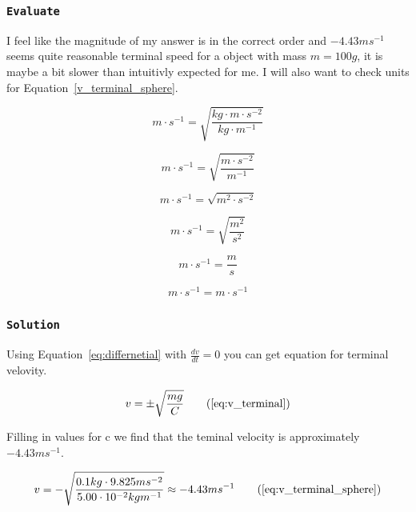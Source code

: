 \documentclass{article}
\let\oldsubsubsection\subsubsection
\renewcommand{\subsubsection}[1]{%
  \oldsubsubsection{\texttt{#1}}%
}
\begin{document}
\clearpage
\subsubsection{Evaluate}
I feel like the magnitude of my answer is in the correct order and \(-4.43ms^{-1}\) seems quite reasonable terminal speed for a object with mass \(m = 100g\), it is maybe a bit slower than intuitivly expected for me. I will also want to check units for Equation~\ref{v_terminal_sphere}.

\begin{equation*}
    m \cdot s^{-1} = \sqrt{\frac{kg \cdot m \cdot s^{-2}}{kg \cdot m^{-1}}}
\end{equation*}

\begin{equation*}
    m \cdot s^{-1} = \sqrt{\frac{m \cdot s^{-2}}{m^{-1}}}
\end{equation*}

\begin{equation*}
    m \cdot s^{-1} = \sqrt{m^2 \cdot s^{-2}}
\end{equation*}

\begin{equation*}
    m \cdot s^{-1} = \sqrt{\frac{m^2}{s^2}}
\end{equation*}

\begin{equation*}
    m \cdot s^{-1} = \frac{m}{s}
\end{equation*}

\begin{equation*}
    m \cdot s^{-1} = m \cdot s^{-1}
\end{equation*}

\subsubsection{Solution}
Using Equation~\ref{eq:differnetial} with \(\frac{dv}{dt}=0\) you can get equation for terminal velovity.

\begin{equation*}
    v = \pm\sqrt{\frac{mg}{C}}
    \tag{\ref{eq:v_terminal}}
\end{equation*}

Filling in values for c we find that the teminal velocity is approximately \(-4.43ms^{-1}\).

\begin{equation*}
    v = -\sqrt{\frac{0.1kg \cdot 9.825 ms^{-2}}{5.00 \cdot10^{-2}kgm^{-1}}} \approx -4.43ms^{-1}
    \tag{\ref{eq:v_terminal_sphere}}
\end{equation*}
\end{document}
